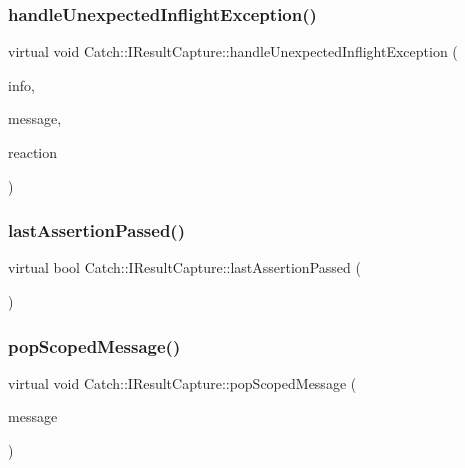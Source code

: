 \subsubsection{\texorpdfstring{handle\+Unexpected\+Inflight\+Exception()}{handleUnexpectedInflightException()}}
{\footnotesize\ttfamily virtual void Catch\+::\+I\+Result\+Capture\+::handle\+Unexpected\+Inflight\+Exception (\begin{DoxyParamCaption}\item[{\mbox{\hyperlink{struct_catch_1_1_assertion_info}{Assertion\+Info}} const \&}]{info,  }\item[{std\+::string const \&}]{message,  }\item[{\mbox{\hyperlink{struct_catch_1_1_assertion_reaction}{Assertion\+Reaction}} \&}]{reaction }\end{DoxyParamCaption})\hspace{0.3cm}{\ttfamily [pure virtual]}}

\mbox{\label{struct_catch_1_1_i_result_capture_a973435fbdcb2f6f07a0ec5719a01e956}} 
\subsubsection{\texorpdfstring{last\+Assertion\+Passed()}{lastAssertionPassed()}}
{\footnotesize\ttfamily virtual bool Catch\+::\+I\+Result\+Capture\+::last\+Assertion\+Passed (\begin{DoxyParamCaption}{ }\end{DoxyParamCaption})\hspace{0.3cm}{\ttfamily [pure virtual]}}

\mbox{\label{struct_catch_1_1_i_result_capture_a42bcb13276706bf8c3ce081ce16d37fd}} 
\subsubsection{\texorpdfstring{pop\+Scoped\+Message()}{popScopedMessage()}}
{\footnotesize\ttfamily virtual void Catch\+::\+I\+Result\+Capture\+::pop\+Scoped\+Message (\begin{DoxyParamCaption}\item[{\mbox{\hyperlink{struct_catch_1_1_message_info}{Message\+Info}} const \&}]{message }\end{DoxyParamCaption})\hspace{0.3cm}{\ttfamily [pure virtual]}}

